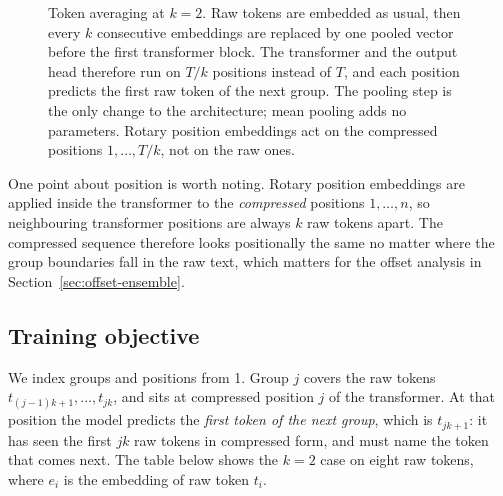 \documentclass[11pt]{article}
\begin{document}
\begin{figure}[t]
\caption{Token averaging at $k{=}2$. Raw tokens are embedded as usual, then
every $k$ consecutive embeddings are replaced by one pooled vector before the
first transformer block. The transformer and the output head therefore run on
$T/k$ positions instead of $T$, and each position predicts the first raw token
of the next group. The pooling step is the only change to the architecture;
mean pooling adds no parameters. Rotary position embeddings act on the
compressed positions $1, \dots, T/k$, not on the raw ones.}
\label{fig:arch}
\end{figure}

One point about position is worth noting. Rotary position embeddings are
applied inside the transformer to the \emph{compressed} positions
$1, \dots, n$, so neighbouring transformer positions are always $k$ raw
tokens apart. The compressed sequence therefore looks positionally the same
no matter where the group boundaries fall in the raw text, which matters for
the offset analysis in Section~\ref{sec:offset-ensemble}.

\subsection{Training objective}
\label{sec:method-objective}

We index groups and positions from 1. Group $j$ covers the raw tokens
$t_{(j-1)k+1}, \dots, t_{jk}$, and sits at compressed position $j$ of the
transformer. At that position the model predicts the \emph{first token of the
next group}, which is $t_{jk+1}$: it has seen the first $jk$ raw tokens in
compressed form, and must name the token that comes next. The table below
shows the $k{=}2$ case on eight raw tokens, where $e_i$ is the embedding of
raw token $t_i$.
\end{document}
